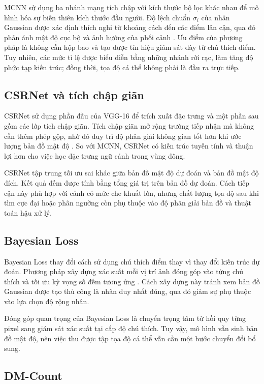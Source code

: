 MCNN sử dụng ba nhánh mạng tích chập với kích thước bộ lọc khác nhau để mô hình hóa sự biến thiên kích thước đầu người. Độ lệch chuẩn $\sigma_i$ của nhân Gaussian được xác định thích nghi từ khoảng cách đến các điểm lân cận, qua đó phản ánh mật độ cục bộ và ảnh hưởng của phối cảnh \cite{zhang2016mcnn}. Ưu điểm của phương pháp là không cần hộp bao và tạo được tín hiệu giám sát dày từ chú thích điểm. Tuy nhiên, các mức tỉ lệ được biểu diễn bằng những nhánh rời rạc, làm tăng độ phức tạp kiến trúc; đồng thời, tọa độ cá thể không phải là đầu ra trực tiếp.

\subsection{CSRNet và tích chập giãn}

CSRNet sử dụng phần đầu của VGG-16 để trích xuất đặc trưng và một phần sau gồm các lớp tích chập giãn. Tích chập giãn mở rộng trường tiếp nhận mà không cần thêm phép gộp, nhờ đó duy trì độ phân giải không gian tốt hơn khi ước lượng bản đồ mật độ \cite{li2018csrnet}. So với MCNN, CSRNet có kiến trúc tuyến tính và thuận lợi hơn cho việc học đặc trưng ngữ cảnh trong vùng đông.

CSRNet tập trung tối ưu sai khác giữa bản đồ mật độ dự đoán và bản đồ mật độ đích. Kết quả đếm được tính bằng tổng giá trị trên bản đồ dự đoán. Cách tiếp cận này phù hợp với cảnh có mức che khuất lớn, nhưng chất lượng tọa độ sau khi tìm cực đại hoặc phân ngưỡng còn phụ thuộc vào độ phân giải bản đồ và thuật toán hậu xử lý.

\subsection{Bayesian Loss}

Bayesian Loss thay đổi cách sử dụng chú thích điểm thay vì thay đổi kiến trúc dự đoán. Phương pháp xây dựng xác suất mỗi vị trí ảnh đóng góp vào từng chú thích và tối ưu kỳ vọng số đếm tương ứng \cite{ma2019bayesian}. Cách xây dựng này tránh xem bản đồ Gaussian được tạo thủ công là nhãn duy nhất đúng, qua đó giảm sự phụ thuộc vào lựa chọn độ rộng nhân.

Đóng góp quan trọng của Bayesian Loss là chuyển trọng tâm từ hồi quy từng pixel sang giám sát xác suất tại cấp độ chú thích. Tuy vậy, mô hình vẫn sinh bản đồ mật độ, nên việc thu được tập tọa độ cá thể vẫn cần một bước chuyển đổi bổ sung.

\subsection{DM-Count}

